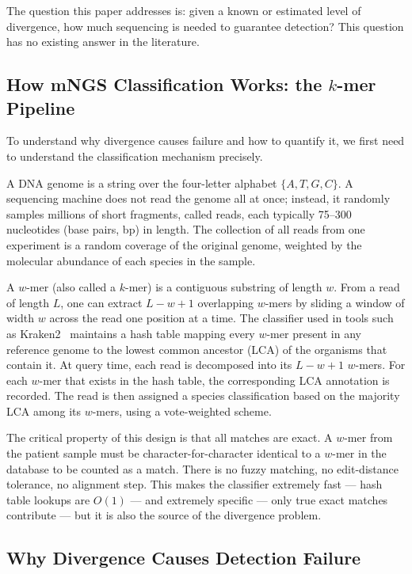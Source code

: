 \documentclass[12pt]{article}
\theoremstyle{definition}
\theoremstyle{plain}
\begin{document}
The question this paper addresses is: given a known or estimated level of
divergence, how much sequencing is needed to guarantee detection? This
question has no existing answer in the literature.

\subsection{How mNGS Classification Works: the $k$-mer Pipeline}

To understand why divergence causes failure and how to quantify it, we first
need to understand the classification mechanism precisely.

A DNA genome is a string over the four-letter alphabet $\{A,T,G,C\}$. A
sequencing machine does not read the genome all at once; instead, it
randomly samples millions of short fragments, called reads, each typically
75--300 nucleotides (base pairs, bp) in length. The collection of all reads
from one experiment is a random coverage of the original genome, weighted by
the molecular abundance of each species in the sample.

A $w$-mer (also called a $k$-mer) is a contiguous substring of length $w$.
From a read of length $L$, one can extract $L-w+1$ overlapping $w$-mers by
sliding a window of width $w$ across the read one position at a time. The
classifier used in tools such as Kraken2~\cite{wood2019} maintains a hash
table mapping every $w$-mer present in any reference genome to the lowest
common ancestor (LCA) of the organisms that contain it. At query time, each
read is decomposed into its $L-w+1$ $w$-mers. For each $w$-mer that exists
in the hash table, the corresponding LCA annotation is recorded. The read is
then assigned a species classification based on the majority LCA among its
$w$-mers, using a vote-weighted scheme.

The critical property of this design is that all matches are exact. A
$w$-mer from the patient sample must be character-for-character identical to
a $w$-mer in the database to be counted as a match. There is no fuzzy
matching, no edit-distance tolerance, no alignment step. This makes the
classifier extremely fast --- hash table lookups are $O(1)$ --- and
extremely specific --- only true exact matches contribute --- but it is also
the source of the divergence problem.

\subsection{Why Divergence Causes Detection Failure}
\end{document}
